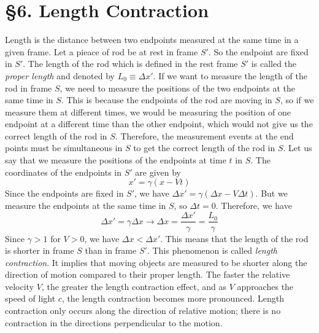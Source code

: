 \documentclass[12pt]{article}
\begin{document}
\section*{§6. Length Contraction}
Length is the distance between two endpoints measured at the same time in a given frame. Let a pieace of rod be at rest in frame $S'$. So the endpoint are fixed in $S'$. The length of the rod which is defined in the rest frame $S'$ is called the \textit{proper length} and denoted by $L_0 \equiv \Delta x'$. If we want to measure the length of the rod in frame $S$, we need to measure the positions of the two endpoints at the same time in $S$. This is because the endpoints of the rod are moving in $S$, so if we measure them at different times, we would be measuring the position of one endpoint at a different time than the other endpoint, which would not give us the correct length of the rod in $S$. Therefore, the measurement events at the end points must be simultaneous in $S$ to get the correct length of the rod in $S$. Let us say that we measure the positions of the endpoints at time $t$ in $S$. The coordinates of the endpoints in $S'$ are given by
\[x' = \gamma(x - Vt)
\]
Since the endpoints are fixed in $S'$, we have $\Delta x' = \gamma(\Delta x - V\Delta t)$. But we measure the endpoints at the same time in $S$, so $\Delta t = 0$. Therefore, we have
\[\Delta x' = \gamma \Delta x \rightarrow \Delta x = \frac{\Delta x'}{\gamma} = \frac{L_0}{\gamma}
\]
Since $\gamma > 1$ for $V > 0$, we have $\Delta x < \Delta x'$. This means that the length of the rod is shorter in frame $S$ than in frame $S'$. This phenomenon is called \textit{length contraction}. It implies that moving objects are measured to be shorter along the direction of motion compared to their proper length. The faster the relative velocity $V$, the greater the length contraction effect, and as $V$ approaches the speed of light $c$, the length contraction becomes more pronounced. Length contraction only occurs along the direction of relative motion; there is no contraction in the directions perpendicular to the motion. 
\end{document}
